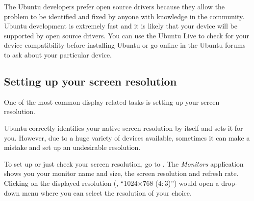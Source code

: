 The Ubuntu developers prefer open source drivers because they allow the problem to be identified and fixed by anyone with knowledge in the community. Ubuntu development is extremely fast and it is likely that your device will be supported by open source drivers. You can use the Ubuntu Live  to check for your device compatibility before installing Ubuntu or go online in the Ubuntu forums to ask about your particular device. 

\subsection{Setting up your screen resolution}

One of the most common display related tasks is setting up your screen resolution. 

Ubuntu correctly identifies your native screen resolution by itself and sets it for you. However, due to a huge variety of devices available, sometimes it can make a mistake and set up an undesirable resolution.

To set up or just check your screen resolution, go to . The \emph{Monitors} application shows you your monitor name and size, the screen resolution and refresh rate. Clicking on the displayed resolution (\eg, ``1024$\times$768 (4$\mathrel{:}$3)'') would open a drop-down menu where you can select the resolution of your choice.
